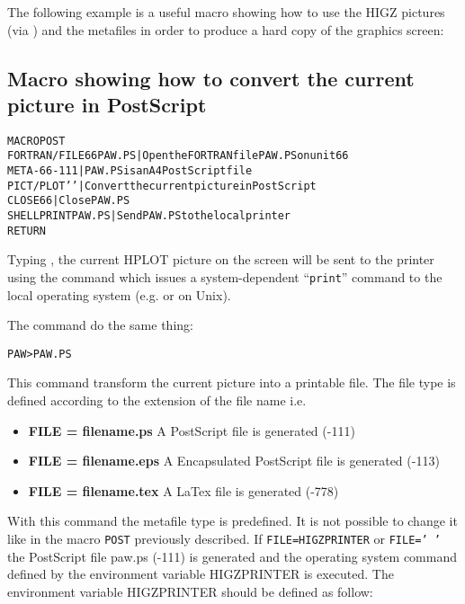 The following example is a useful macro showing how to use the HIGZ pictures
(via ) and the metafiles in order 
to produce a hard copy of the graphics screen:
\label{sec:POSTmacro}

\subsection*{Macro showing how to convert the current picture in
  PostScript}
\begin{alltt}
         MACRO POST
         FORTRAN/FILE 66 PAW.PS  | Open the FORTRAN file PAW.PS on unit 66
         META -66 -111           | PAW.PS is an A4 PostScript file
         PICT/PLOT ' '           | Convert the current picture in PostScript
         CLOSE 66                | Close PAW.PS
         SHELL PRINT PAW.PS      | Send PAW.PS to the local printer
         RETURN
\end{alltt}

Typing , the current HPLOT picture on the
screen will be sent to the printer using the  command
which issues a system-dependent ``\texttt{print}'' command to the local operating
system (e.g.  or  on Unix).

The command  do the same thing:

\begin{alltt}
PAW >  PAW.PS
\end{alltt}

This command transform the current picture into a printable file. The file 
type is defined according to the extension of the file name i.e.

\begin{itemize}
\item {\bf FILE = filename.ps }  A PostScript file is generated (-111)
\item {\bf FILE = filename.eps}  A Encapsulated PostScript file
                                 is generated (-113)
\item {\bf FILE = filename.tex}  A LaTex file is generated (-778)
\end{itemize}

With this command the metafile type is predefined. It is not possible to
change it like in the macro \texttt{POST} previously described.
If \texttt{FILE=HIGZPRINTER} or \texttt{FILE=' '} the PostScript file paw.ps (-111) is
generated and the operating system command defined by the environment
variable HIGZPRINTER is executed.
The environment variable HIGZPRINTER should be defined as follow:


